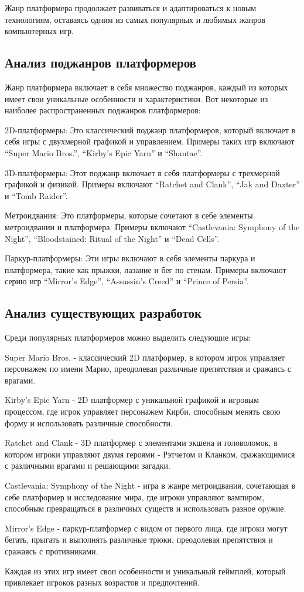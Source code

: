 Жанр платформера продолжает развиваться и адаптироваться к новым технологиям, оставаясь одним из самых популярных и любимых жанров компьютерных игр.
\subsection{Анализ поджанров платформеров}

Жанр платформера включает в себя множество поджанров, каждый из которых имеет свои уникальные особенности и характеристики. Вот некоторые из наиболее распространенных поджанров платформеров:

2D-платформеры: Это классический поджанр платформеров, который включает в себя игры с двухмерной графикой и управлением. Примеры таких игр включают “Super Mario Bros.”, “Kirby’s Epic Yarn” и “Shantae”.

3D-платформеры: Этот поджанр включает в себя платформеры с трехмерной графикой и физикой. Примеры включают “Ratchet and Clank”, “Jak and Daxter” и “Tomb Raider”.

Метроидвания: Это платформеры, которые сочетают в себе элементы метроидвании и платформера. Примеры включают “Castlevania: Symphony of the Night”, “Bloodstained: Ritual of the Night” и “Dead Cells”.

Паркур-платформеры: Эти игры включают в себя элементы паркура и платформера, такие как прыжки, лазание и бег по стенам. Примеры включают серию игр “Mirror’s Edge”, “Assassin’s Creed” и “Prince of Persia”.
\subsection{Анализ существующих разработок}

Среди популярных платформеров можно выделить следующие игры:

Super Mario Bros. - классический 2D платформер, в котором игрок управляет персонажем по имени Марио, преодолевая различные препятствия и сражаясь с врагами.

Kirby’s Epic Yarn - 2D платформер с уникальной графикой и игровым процессом, где игрок управляет персонажем Кирби, способным менять свою форму и использовать различные способности.

Ratchet and Clank - 3D платформер с элементами экшена и головоломок, в котором игроки управляют двумя героями - Рэтчетом и Кланком, сражающимися с различными врагами и решающими загадки.

Castlevania: Symphony of the Night - игра в жанре метроидвания, сочетающая в себе платформер и исследование мира, где игроки управляют вампиром, способным превращаться в различных существ и использовать разное оружие.

Mirror’s Edge - паркур-платформер с видом от первого лица, где игроки могут бегать, прыгать и выполнять различные трюки, преодолевая препятствия и сражаясь с противниками.

Каждая из этих игр имеет свои особенности и уникальный геймплей, который привлекает игроков разных возрастов и предпочтений.
